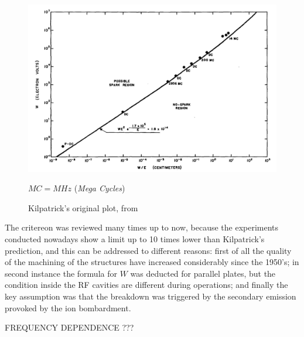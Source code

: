 \begin{figure}[h]
\centering

\includegraphics[scale=0.3]{pictures/kilpatrickCrit}
\caption{Kilpatrick's original plot, from \cite{KilpLimit}} $MC = MHz$ (\textit{Mega Cycles})
\label{kilpPlot}

\end{figure}

The critereon was reviewed many times up to now, because the experiments conducted nowadays show a limit up to 10 times lower than Kilpatrick's prediction, and this can be addressed to different reasons: first of all the quality of the machining of the structures have increased considerably since the 1950's; in second instance the formula for $W$ was deducted for parallel plates, but the condition inside the RF cavities are different during operations; and finally the key assumption was that the breakdown was triggered by the secondary emission provoked by the ion bombardment.

FREQUENCY DEPENDENCE ???
